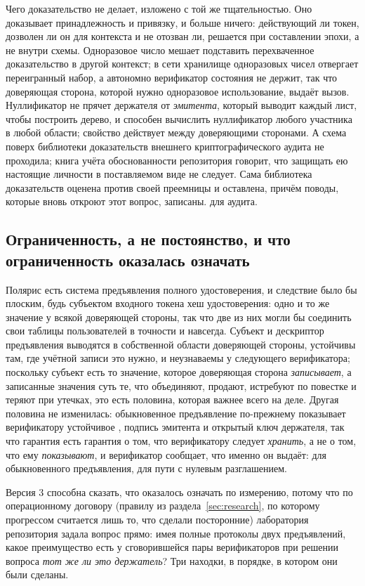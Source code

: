 Чего доказательство не делает, изложено с той же тщательностью. Оно доказывает принадлежность и
привязку, и больше ничего: действующий ли токен, дозволен ли он для контекста и не отозван ли,
решается при составлении эпохи, а не внутри схемы. Одноразовое число мешает подставить
перехваченное доказательство в другой контекст; в сети хранилище одноразовых чисел отвергает
переигранный набор, а автономно верификатор состояния не держит, так что доверяющая сторона,
которой нужно одноразовое использование, выдаёт вызов. Нуллификатор не прячет держателя от
\emph{эмитента}, который выводит каждый лист, чтобы построить дерево, и способен вычислить
нуллификатор любого участника в любой области; свойство действует между доверяющими сторонами. А
схема поверх библиотеки доказательств внешнего криптографического аудита не проходила; книга учёта
обоснованности репозитория говорит, что защищать ею настоящие личности в поставляемом виде не
следует. Сама библиотека доказательств оценена против своей преемницы и оставлена, причём поводы, которые вновь откроют этот вопрос, записаны. \sExt{} для
аудита.

\subsection{Ограниченность, а не постоянство, и что ограниченность оказалась означать}

Полярис есть система предъявления полного удостоверения, и следствие было бы плоским, будь
субъектом входного токена хеш удостоверения: одно и то же значение у всякой доверяющей стороны, так
что две из них могли бы соединить свои таблицы пользователей в точности и навсегда. Субъект и
дескриптор предъявления выводятся в собственной области доверяющей
стороны, устойчивы там, где учётной записи это нужно, и неузнаваемы у следующего верификатора;
поскольку субъект есть то значение, которое доверяющая сторона \emph{записывает}, а записанные
значения суть те, что объединяют, продают, истребуют по повестке и теряют при утечках, это есть
половина, которая важнее всего на деле. Другая половина не изменилась: обыкновенное предъявление
по-прежнему показывает верификатору устойчивое , подпись эмитента и открытый
ключ держателя, так что гарантия есть гарантия о том, что верификатору следует \emph{хранить}, а
не о том, что ему \emph{показывают}, и верификатор сообщает, что именно он выдаёт:
 для обыкновенного предъявления,  для пути с нулевым разглашением.
\sImpl

Версия 3 способна сказать, что  оказалось означать по измерению, потому что по
операционному договору (правилу из раздела~\ref{sec:research}, по которому прогрессом считается лишь
то, что сделали посторонние) лаборатория репозитория задала вопрос прямо: имея полные протоколы двух
предъявлений, какое преимущество есть у сговорившейся пары верификаторов при решении вопроса
\emph{тот же ли это держатель}? Три находки, в порядке, в котором они были сделаны.

